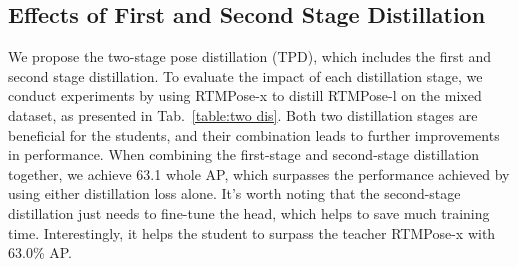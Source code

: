 \documentclass[10pt,twocolumn,letterpaper]{article}
\begin{document}
\begin{table}
  \centering
  \vspace{0.1cm}
  \caption{Results of evaluating the models on the UBody dataset. `*' indicates the models trained on both COCO and UBody datasets. The numbers are  AP scores for two different input sizes.}
  \label{table:ubody performance}
\end{table}

\subsection{Effects of First and Second Stage Distillation}
We propose the two-stage pose distillation (TPD), which includes the first and second stage distillation. To evaluate the impact of each distillation stage, we conduct experiments by using RTMPose-x to distill RTMPose-l on the mixed dataset, as presented in Tab.~\ref{table:two dis}. Both two distillation stages are beneficial for the students, and their combination leads to further improvements in performance. When combining the first-stage and second-stage distillation together, we achieve 63.1 whole AP, which surpasses the performance achieved by using either distillation loss alone. It's worth noting that the second-stage distillation just needs to fine-tune the head, which helps to save much training time. Interestingly, it helps the student to surpass the teacher RTMPose-x with 63.0\% AP.
\end{document}
